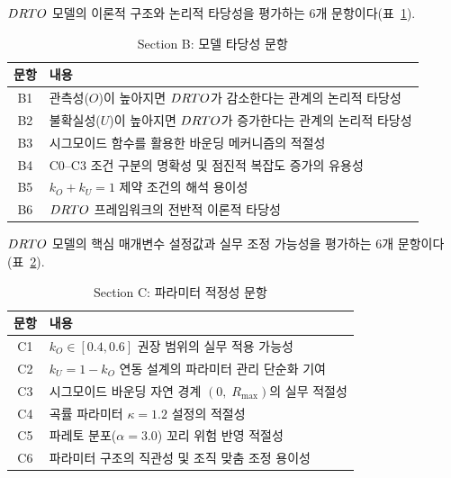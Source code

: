 \label{app:survey-items}

\label{app:survey-b}

$DRTO$ 모델의 이론적 구조와 논리적 타당성을 평가하는 6개 문항이다(\p{[}표~\ref{tab:app-survey-items-b}\p{]}).

\begin{table}[htbp]
\centering
\caption{Section B: 모델 타당성 문항}
\label{tab:app-survey-items-b}
\small
\begin{tabularx}{\textwidth}{cX}
\toprule
\textbf{문항} & \textbf{내용} \\
\midrule
B1 & 관측성($O$)이 높아지면 $DRTO$가 감소한다는 관계의 논리적 타당성 \\
B2 & 불확실성($U$)이 높아지면 $DRTO$가 증가한다는 관계의 논리적 타당성 \\
B3 & 시그모이드 함수를 활용한 바운딩 메커니즘의 적절성 \\
B4 & C0--C3 조건 구분의 명확성 및 점진적 복잡도 증가의 유용성 \\
B5 & $k_O + k_U = 1$ 제약 조건의 해석 용이성 \\
B6 & $DRTO$ 프레임워크의 전반적 이론적 타당성 \\
\bottomrule
\end{tabularx}
\end{table}

\label{app:survey-c}

$DRTO$ 모델의 핵심 매개변수 설정값과 실무 조정 가능성을 평가하는 6개 문항이다(\p{[}표~\ref{tab:app-survey-items-c}\p{]}).

\begin{table}[htbp]
\centering
\caption{Section C: 파라미터 적정성 문항}
\label{tab:app-survey-items-c}
\small
\begin{tabularx}{\textwidth}{cX}
\toprule
\textbf{문항} & \textbf{내용} \\
\midrule
C1 & $k_O \in [0.4, 0.6]$ 권장 범위의 실무 적용 가능성 \\
C2 & $k_U = 1 - k_O$ 연동 설계의 파라미터 관리 단순화 기여 \\
C3 & 시그모이드 바운딩 자연 경계 $(0,\; R_{\max})$의 실무 적절성 \\
C4 & 곡률 파라미터 $\kappa = 1.2$ 설정의 적절성 \\
C5 & 파레토 분포($\alpha = 3.0$) 꼬리 위험 반영 적절성 \\
C6 & 파라미터 구조의 직관성 및 조직 맞춤 조정 용이성 \\
\bottomrule
\end{tabularx}
\end{table}


